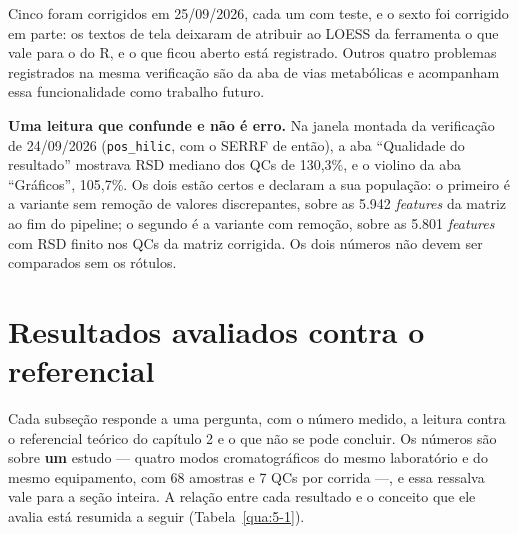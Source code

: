 Cinco foram corrigidos em 25/09/2026, cada um com teste, e o sexto foi corrigido em parte: os textos de tela deixaram de atribuir ao LOESS da ferramenta o que vale para o do R, e o que ficou aberto está registrado. Outros quatro problemas registrados na mesma verificação são da aba de vias metabólicas e acompanham essa funcionalidade como trabalho futuro.


\textbf{Uma leitura que confunde e não é erro.} Na janela montada da verificação de 24/09/2026 (\texttt{pos\_\allowbreak{}hilic}, com o SERRF de então), a aba ``Qualidade do resultado'' mostrava RSD mediano dos QCs de 130,3\%, e o violino da aba ``Gráficos'', 105,7\%. Os dois estão certos e declaram a sua população: o primeiro é a variante sem remoção de valores discrepantes, sobre as 5.942 \textit{features} da matriz ao fim do pipeline; o segundo é a variante com remoção, sobre as 5.801 \textit{features} com RSD finito nos QCs da matriz corrigida. Os dois números não devem ser comparados sem os rótulos.

\section{Resultados avaliados contra o referencial}\label{sec:5-3}

Cada subseção responde a uma pergunta, com o número medido, a leitura contra o referencial teórico do capítulo 2 e o que não se pode concluir. Os números são sobre \textbf{um} estudo --- quatro modos cromatográficos do mesmo laboratório e do mesmo equipamento, com 68 amostras e 7 QCs por corrida ---, e essa ressalva vale para a seção inteira. A relação entre cada resultado e o conceito que ele avalia está resumida a seguir (Tabela~\ref{qua:5-1}).

